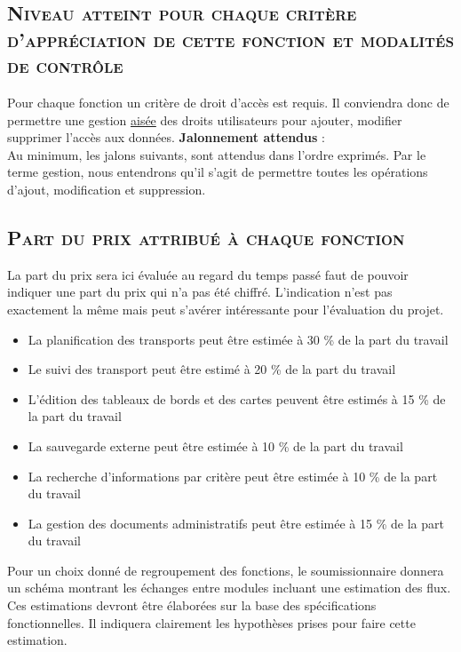 \subsection{\textsc{Niveau atteint pour chaque critère d'appréciation de cette fonction et modalités de contrôle}}
Pour chaque fonction un critère de droit d'accès est requis. Il conviendra donc de permettre une gestion \underline{aisée} des droits utilisateurs pour ajouter, modifier supprimer l'accès aux données.
\textbf{Jalonnement attendus} :
\\
Au minimum, les jalons suivants, sont attendus dans l'ordre exprimés. Par le terme \og{}gestion\fg{}, nous entendrons qu'il s'agit de permettre toutes les opérations d'ajout, modification et suppression.

\subsection{\textsc{Part du prix attribué à chaque fonction}}
La part du prix sera ici évaluée au regard du temps passé faut de pouvoir indiquer une part du prix qui n'a pas été chiffré. L'indication n'est pas exactement la même mais peut s'avérer intéressante pour l'évaluation du projet. 
\begin{itemize}[label=\textbullet]
 \item La planification des transports peut être estimée à 30 \% de la part du travail
 \item Le suivi des transport peut être estimé à 20 \% de la part du travail
 \item L'édition des tableaux de bords et des cartes peuvent être estimés à 15 \% de la part du travail
 \item La sauvegarde externe peut être estimée à 10 \% de la part du travail
 \item La recherche d'informations par critère peut être estimée à 10 \% de la part du travail
 \item La gestion des documents administratifs peut être estimée à 15 \% de la part du travail
\end{itemize}
Pour un choix donné de regroupement des fonctions, le soumissionnaire donnera un schéma montrant les échanges entre modules incluant une estimation des flux. 
\\
Ces estimations devront être élaborées sur la base des spécifications fonctionnelles. Il indiquera clairement les hypothèses prises pour faire cette estimation. 

